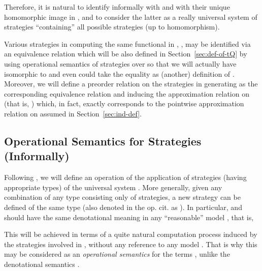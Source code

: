 \documentclass[fleqn]{LMCS}
\theoremstyle{plain}\newtheorem{satz}[thm]{Satz}
\theoremstyle{plain}\newtheorem{hyp}[thm]{Hypothesis}
\theoremstyle{plain}\newtheorem{hyps}[thm]{Hypotheses}
\theoremstyle{definition}\newtheorem{note}[thm]{Note}
\newcommand{\?}{\mbox{?}}
\begin{document}
\noindent
Therefore, it is natural to identify informally  with  
and with their unique homomorphic image in , 
and to consider the latter as a really universal system of strategies ``containing'' 
all possible strategies (up to homomorphism). 


\medskip

Various strategies in  
computing the same functional in , , 
may be identified via an equivalence relation  
which will be also defined in Section~\ref{sec:def-of-tQ} by using 
operational semantics of strategies 
over  
so that we will actually have
 isomorphic to  
and even could take the equality
 as (another) definition of .
Moreover, we will define a preorder relation  
on the strategies in  generating  
as the corresponding equivalence relation 
and inducing the approximation relation 
 on  
(that is, ) 
which, in fact, exactly corresponds to the pointwise approximation 
relation on  assumed in Section~\ref{sec:ind-def}.

\subsection{Operational Semantics for Strategies (Informally)}
\label{sec:operational-sem-informal}

\noindent
Following \cite{Saz76SMZH}, we will define an operation  
of the application of strategies (having appropriate types) 
of the universal system . 
More generally, given any combination 
 of any type  
consisting only of strategies, 
a new strategy can be defined  of the same type  
(also denoted in the op. cit. as ). 
In particular,  and  should have the same denotational meaning 
in any ``reasonable'' model , that is, 

This will be achieved in terms of 
a quite natural computation 
process induced by the strategies involved in , without any reference 
to any model . That is why this may be considered 
as an \emph{operational semantics}  for the terms , 
unlike the denotational semantics .
\end{document}
